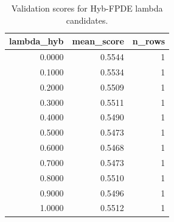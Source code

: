 \begin{table}[t]
\caption{Validation scores for Hyb-FPDE lambda candidates.}
\label{tab:lambda_distribution_computed}
\centering
\begin{tabular}{rrr}
\toprule
lambda\_hyb & mean\_score & n\_rows \\
\midrule
0.0000 & 0.5544 & 1 \\
0.1000 & 0.5534 & 1 \\
0.2000 & 0.5509 & 1 \\
0.3000 & 0.5511 & 1 \\
0.4000 & 0.5490 & 1 \\
0.5000 & 0.5473 & 1 \\
0.6000 & 0.5468 & 1 \\
0.7000 & 0.5473 & 1 \\
0.8000 & 0.5510 & 1 \\
0.9000 & 0.5496 & 1 \\
1.0000 & 0.5512 & 1 \\
\bottomrule
\end{tabular}

\end{table}
